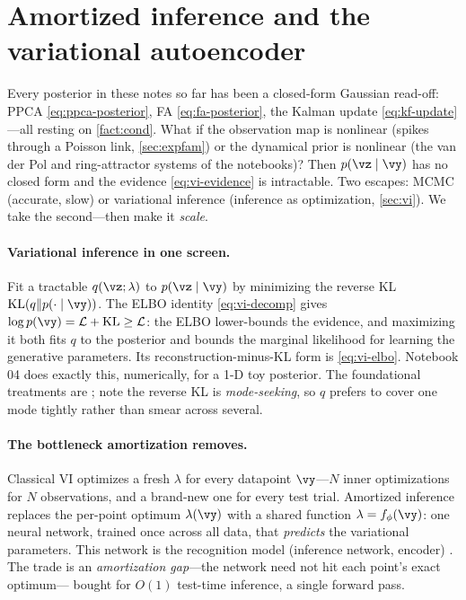 \documentclass[11pt]{article}
\theoremstyle{plain}
\theoremstyle{definition}
\theoremstyle{remark}
\theoremstyle{definition}
\begin{document}
\section{Amortized inference and the variational autoencoder}\label{sec:amortized}

Every posterior in these notes so far has been a closed-form Gaussian read-off:
PPCA \eqref{eq:ppca-posterior}, FA \eqref{eq:fa-posterior}, the Kalman update
\eqref{eq:kf-update}---all resting on \cref{fact:cond}. What if the observation map
is nonlinear (spikes through a Poisson link, \cref{sec:expfam}) or the dynamical
prior is nonlinear (the van der Pol and ring-attractor systems of the notebooks)?
Then $p(\vz\mid\vy)$ has no closed form and the evidence \eqref{eq:vi-evidence} is
intractable. Two escapes: MCMC (accurate, slow) or variational inference (inference
as optimization, \cref{sec:vi}). We take the second---then make it \emph{scale}.

\paragraph{Variational inference in one screen.} Fit a tractable $q(\vz;
\lambda)$ to $p(\vz\mid\vy)$ by minimizing the reverse KL $\mathrm{KL}(q \Vert
p(\cdot\mid\vy))$. The ELBO identity \eqref{eq:vi-decomp} gives $\log p(\vy) =
\mathcal{L} + \mathrm{KL} \geq \mathcal{L}$: the ELBO lower-bounds the evidence, and
maximizing it both fits $q$ to the posterior and bounds the marginal likelihood for
learning the generative parameters. Its reconstruction-minus-KL form is
\eqref{eq:vi-elbo}. Notebook 04 does exactly this, numerically, for a 1-D toy
posterior. The foundational treatments are \parencite{Jordan1999-vi,
Blei2017-vi}; note the reverse KL is \emph{mode-seeking}, so $q$ prefers to cover
one mode tightly rather than smear across several.

\paragraph{The bottleneck amortization removes.} Classical VI optimizes a fresh
$\lambda$ for every datapoint $\vy$---$N$ inner optimizations for $N$
observations, and a brand-new one for every test trial. Amortized inference
replaces the per-point optimum $\lambda(\vy)$ with a shared function $\lambda =
f_{\phi}(\vy)$: one neural network, trained once across all data, that
\emph{predicts} the variational parameters. This network is the recognition model
(inference network, encoder) \parencite{Gershman2014-amortized}. The trade is an
\emph{amortization gap}---the network need not hit each point's exact optimum---
bought for $O(1)$ test-time inference, a single forward pass.
\end{document}
